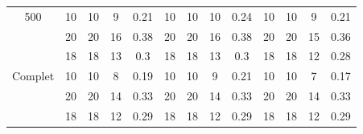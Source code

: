 \documentclass[a4paper,11pt]{article}%
\begin{document}
\begin{table}[p]
\begin{center}
\begin{tabular}{|@{}c@{}|@{}c@{}|@{}c@{}|@{}c@{}|@{}c@{}||@{}c@{}|@{}c@{}|@{}c@{}|@{}c@{}||@{}c@{}|@{}c@{}|@{}c@{}|@{}c@{}|}
  \hline
   500 & 10& 10 & 9 & 0.21 & 10& 10 & 10 & 0.24 & 10& 10 & 9 & 0.21  \\
 \cline{2-13} 
    & 20& 20& 16 & 0.38 & 20&20 & 16 & 0.38 & 20&20 & 15 & 0.36  \\
  \cline{2-13} 
    & 18&18 & 13 & 0.3 & 18&18 & 13 & 0.3 & 18&18 & 12 & 0.28  \\
  \hline
   Complet & 10& 10& 8 & 0.19&  10&10 & 9 & 0.21 & 10& 10& 7 & 0.17  \\
 \cline{2-13} 
    & 20&20 & 14 & 0.33 & 20&20 & 14 & 0.33 & 20&20 & 14 & 0.33  \\
  \cline{2-13} 
    & 18&18 & 12 & 0.29 & 18&18 & 12 & 0.29 & 18&18 & 12 & 0.29  \\
  \hline
  
\end{tabular}
\end{center}
\end{table}
\end{document}
